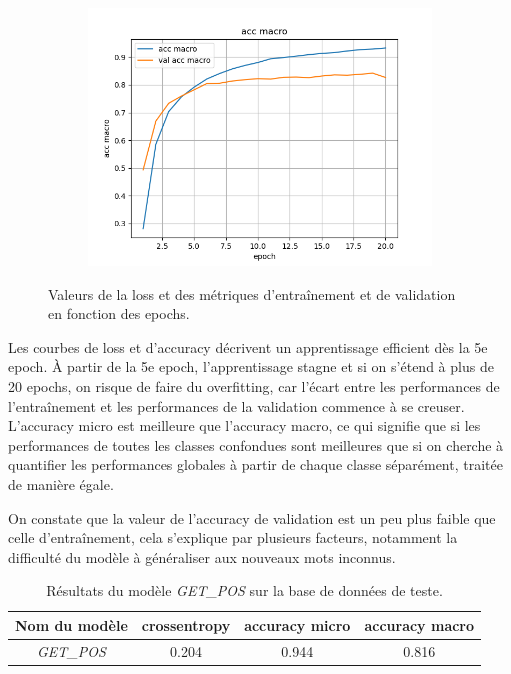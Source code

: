 \documentclass[a4paper]{article}
\begin{document}
\begin{figure}[H]
\begin{subfigure}{0.32\textwidth}
        \includegraphics[width=\linewidth]{../logs/get_pos_French/acc macro.png}
    \end{subfigure}
    \caption{Valeurs de la loss et des métriques d'entraînement et de validation en fonction des epochs.}
\end{figure}

Les courbes de loss et d'accuracy décrivent un apprentissage efficient dès la 5e epoch. À partir de la 5e epoch, l'apprentissage
stagne et si on s'étend à plus de 20 epochs, on risque de faire du overfitting, car l'écart entre les performances de l'entraînement
et les performances de la validation commence à se creuser. 
L'accuracy micro est meilleure que l'accuracy macro, ce qui signifie que si les performances de toutes les classes confondues sont
meilleures que si on cherche à quantifier les performances globales à partir de chaque classe séparément, traitée de manière égale.

On constate que la valeur de l'accuracy de validation est un peu plus faible que celle d'entraînement, cela 
s'explique par plusieurs facteurs, notamment la difficulté du modèle à généraliser aux nouveaux mots inconnus.


\begin{table}
    \centering
    \begin{tabular}{|c|c|c|c|}
        \hline
        Nom du modèle & crossentropy & accuracy micro & accuracy macro \\
        \hline
        \textit{GET\_POS} & 0.204 & 0.944 & 0.816\\
        \hline
    \end{tabular}
    \caption{Résultats du modèle \textit{GET\_POS} sur la base de données de teste.}
    \label{tab:test getpos}
\end{table}
\end{document}
